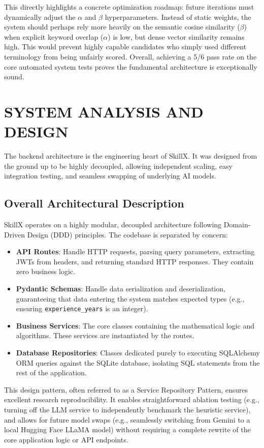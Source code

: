 \documentclass[12pt,a4paper]{report}
\begin{document}
This directly highlights a concrete optimization roadmap: future iterations must dynamically adjust the $\alpha$ and $\beta$ hyperparameters. Instead of static weights, the system should perhaps rely more heavily on the semantic cosine similarity ($\beta$) when explicit keyword overlap ($\alpha$) is low, but dense vector similarity remains high. This would prevent highly capable candidates who simply used different terminology from being unfairly scored. Overall, achieving a 5/6 pass rate on the core automated system tests proves the fundamental architecture is exceptionally sound.

\chapter{SYSTEM ANALYSIS AND DESIGN}

The backend architecture is the engineering heart of SkillX. It was designed from the ground up to be highly decoupled, allowing independent scaling, easy integration testing, and seamless swapping of underlying AI models.

\section{Overall Architectural Description}

SkillX operates on a highly modular, decoupled architecture following Domain-Driven Design (DDD) principles. The codebase is separated by concern:
\begin{itemize}
    \item \textbf{API Routes}: Handle HTTP requests, parsing query parameters, extracting JWTs from headers, and returning standard HTTP responses. They contain zero business logic.
    \item \textbf{Pydantic Schemas}: Handle data serialization and deserialization, guaranteeing that data entering the system matches expected types (e.g., ensuring \texttt{experience\_years} is an integer).
    \item \textbf{Business Services}: The core classes containing the mathematical logic and algorithms. These services are instantiated by the routes.
    \item \textbf{Database Repositories}: Classes dedicated purely to executing SQLAlchemy ORM queries against the SQLite database, isolating SQL statements from the rest of the application.
\end{itemize}

This design pattern, often referred to as a Service Repository Pattern, ensures excellent research reproducibility. It enables straightforward ablation testing (e.g., turning off the LLM service to independently benchmark the heuristic service), and allows for future model swaps (e.g., seamlessly switching from Gemini to a local Hugging Face LLaMA model) without requiring a complete rewrite of the core application logic or API endpoints.
\end{document}
